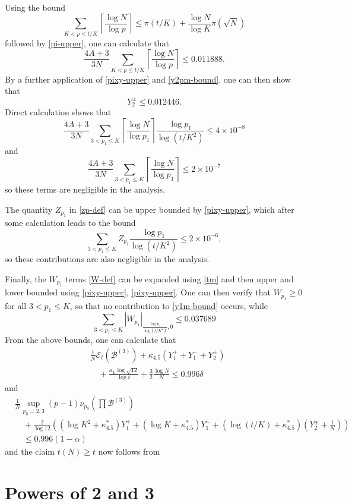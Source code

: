 \documentclass[12pt,a4paper,reqno]{amsart}
\numberwithin{equation}{section}
\theoremstyle{plain}
\theoremstyle{definition}
\newcommand\tuple{{\mathcal B}}
\newcommand\excess{{\mathcal{E}}}
\begin{document}
Using the bound
$$ \sum_{K < p \leq t/K} \left\lceil \frac{\log N}{\log p} \right\rceil \leq \pi(t/K) + \frac{\log N}{\log K} \pi(\sqrt{N})$$
followed by \eqref{pi-upper}, one can calculate that
$$ \frac{4A+3}{3N} \sum_{K < p \leq t/K} \left\lceil \frac{\log N}{\log p}\right\rceil \leq 0.011888.$$
By a further application of \eqref{pixy-upper} and \eqref{y2pm-bound}, one can then show that
$$ Y^\pm_2 \leq 0.012446.$$
Direct calculation shows that
$$ \frac{4A+3}{3N} \sum_{3 < p_1 \leq K} \left\lceil \frac{\log N}{\log p_1} \right\rceil \frac{\log p_1}{\log(t/K^2)} \leq 4 \times 10^{-8}$$
and
$$ \frac{4A+3}{3N} \sum_{3 < p_1 \leq K} \left\lceil \frac{\log N}{\log p_1} \right\rceil \leq 2 \times 10^{-7}$$
so these terms are negligible in the analysis. 

The quantity $Z_{p_1}$ in \eqref{zp-def} can be upper bounded by \eqref{pixy-upper}, which after some calculation leads to the bound
$$ \sum_{3 < p_1 \leq K} Z_{p_1} \frac{\log p_1}{\log(t/K^2)} \leq 2 \times 10^{-6},$$
so these contributions are also negligible in the analysis.

Finally, the $W_{p_1}$ terms \eqref{W-def} can be expanded using \eqref{tm} and then upper and lower bounded using \eqref{pixy-upper}, \eqref{pixy-upper}.  One can then verify that $W_{p_1} \geq 0$ for all $3 < p_1 \leq K$, so that no contribution to \eqref{y1m-bound} occurs, while
$$ \sum_{3 < p_1 \leq K} |W_{p_1}|_{\frac{\log p_1}{\log (t/K^2)}, 0} \leq 0.037689$$
From the above bounds, one can calculate that
\begin{align*}
&  \frac{1}{N} \excess_t(\tuple^{(3)}) + \kappa_{4.5}(Y_1^+ + Y_1^- + Y_2^\pm) \\
&\quad + \frac{\kappa_L \log \sqrt{12}}{\log t} + \frac{3}{2} \frac{\log N}{N} \leq 0.996 \delta
\end{align*}
and
\begin{align*}
  &\frac{1}{N} \sup_{p_0=2,3} (p-1) \nu_{p_0}\left(\prod \tuple^{(3)}\right) \\
  &\quad + \frac{2}{\log 12} \left( (\log K^2 +\kappa^*_{4.5}) Y_1^+ + (\log K + \kappa^*_{4.5}) Y_1^- + (\log(t/K) +\kappa^*_{4.5}) (Y_2^\pm+\frac{1}{N})  \right)
  \\
    &\quad  \leq 0.996 (1-\alpha) 
\end{align*}
and the claim $t(N) \geq t$ now follows from 

\appendix

\section{Powers of 2 and 3}\label{power-sec}
\end{document}
